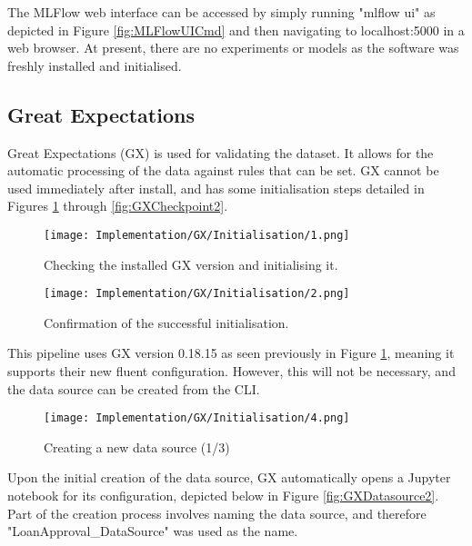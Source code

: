 \para The MLFlow web interface can be accessed by simply running "mlflow ui" as depicted in Figure \ref{fig:MLFlowUICmd}
and then navigating to localhost:5000 in a web browser. At present, there are no experiments or models as the software 
was freshly installed and initialised.

\subsection{Great Expectations}
Great Expectations (GX) is used for validating the dataset. It allows for the automatic processing of 
the data against rules that can be set. GX cannot be used immediately after install, and has some initialisation 
steps detailed in Figures \ref{fig:GXVersion} through \ref{fig:GXCheckpoint2}.

\begin{figure}[H]
    \centering
    \texttt{[image: Implementation/GX/Initialisation/1.png]}
    \caption{Checking the installed GX version and initialising it.}
    \label{fig:GXVersion}
\end{figure}

\begin{figure}[H]
    \centering
    \texttt{[image: Implementation/GX/Initialisation/2.png]}
    \caption{Confirmation of the successful initialisation.}
    \label{fig:GXInitConfirm}
\end{figure}


\para This pipeline uses GX version 0.18.15 as seen previously in Figure \ref{fig:GXVersion},
meaning it supports their new fluent configuration. However, this will not be necessary,
and the data source can be created from the CLI.

\begin{figure}[H]
    \centering
    \texttt{[image: Implementation/GX/Initialisation/4.png]}
    \caption{Creating a new data source (1/3)}
    \label{fig:GXDatasource1}
\end{figure}

\para Upon the initial creation of the data source, GX automatically opens a Jupyter notebook for its 
configuration, depicted below in Figure \ref{fig:GXDatasource2}. Part of the creation process 
involves naming the data source, and therefore "LoanApproval\_DataSource" was used as the name.

